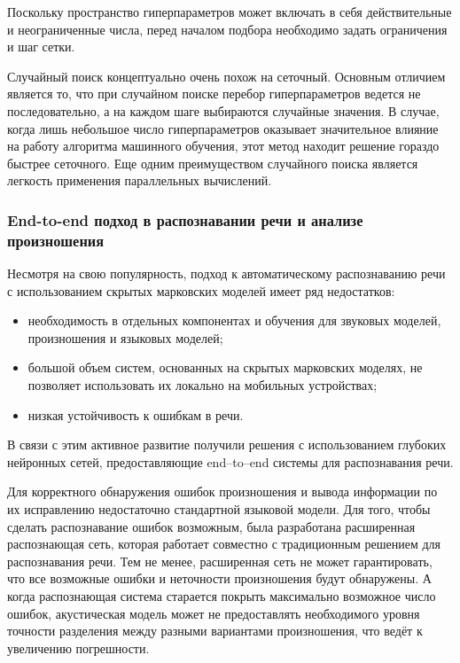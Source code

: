 Поскольку пространство гиперпараметров может включать в себя действительные и неограниченные числа, перед началом подбора необходимо задать ограничения и шаг сетки.

Случайный поиск концептуально очень похож на сеточный. Основным отличием является то, что при случайном поиске перебор гиперпараметров ведется не последовательно, а на каждом шаге выбираются случайные значения\cite{hyperparamopt-random}. В случае, когда лишь небольшое число гиперпараметров оказывает значительное влияние на работу алгоритма машинного обучения, этот метод находит решение гораздо быстрее сеточного. Еще одним преимуществом случайного поиска является легкость применения параллельных вычислений.

\subsubsection{End-to-end подход в распознавании речи и анализе произношения}
\label{section:e2e-approach}
Несмотря на свою популярность, подход к автоматическому распознаванию речи с использованием скрытых марковских моделей имеет ряд недостатков:
\begin{itemize}
	\item необходимость в отдельных компонентах и обучения для звуковых моделей, произношения и языковых моделей;
	\item большой объем систем, основанных на скрытых марковских моделях, не позволяет использовать их локально на мобильных устройствах;
	\item низкая устойчивость к ошибкам в речи.
\end{itemize}

В связи с этим активное развитие получили решения с использованием глубоких нейронных сетей, предоставляющие end--to--end системы для распознавания речи\cite{graves2014towards}.

Для корректного обнаружения ошибок произношения и вывода информации по их исправлению недостаточно стандартной языковой модели. Для того, чтобы сделать распознавание ошибок возможным, была разработана расширенная распознающая сеть, которая работает совместно с традиционным решением для распознавания речи\cite{harrison2009implementation}. Тем не менее, расширенная сеть не может гарантировать, что все возможные ошибки и неточности произношения будут обнаружены. А когда распознающая система старается покрыть максимально возможное число ошибок, акустическая модель может не предоставлять необходимого уровня точности разделения между разными вариантами произношения, что ведёт к увеличению погрешности.

